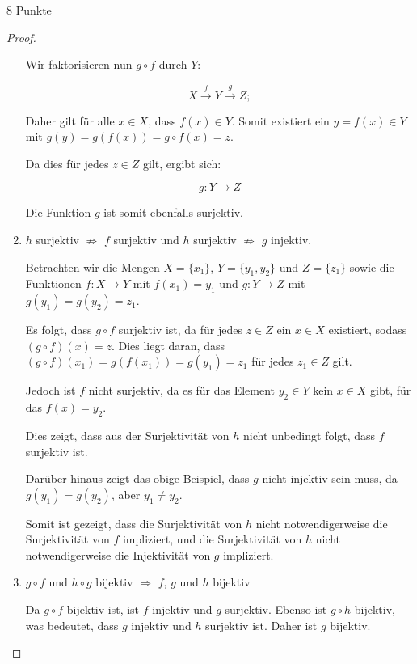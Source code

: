 \documentclass{problemset}
\begin{document}
\begin{problem}{8 Punkte}
\begin{proof}
\begin{enumerate}
              Wir faktorisieren nun \(g \circ f\) durch \(Y\):

              \[ X \overset{f}{\to} Y \overset{g}{\to} Z; \]

              Daher gilt für alle \(x \in X\), dass \(f(x) \in Y\). Somit
              existiert ein \(y = f(x) \in Y\) mit \(g(y) = g(f(x)) = g \circ
              f(x) = z\).

              Da dies für jedes \(z \in Z\) gilt, ergibt sich:

              \[ g: Y \to Z \]

              Die Funktion \(g\) ist somit ebenfalls surjektiv.

        \item $h$ surjektiv $\not\Rightarrow$ $f$ surjektiv und $h$ surjektiv $\not\Rightarrow$ $g$ injektiv.

              Betrachten wir die Mengen $X = \{x_1\}$, $Y = \{y_1, y_2\}$ und
              $Z = \{z_1\}$ sowie die Funktionen $f: X \to Y$ mit $f(x_1) =
              y_1$ und $g: Y \to Z$ mit $g(y_1) = g(y_2) = z_1$.

              Es folgt, dass $g \circ f$ surjektiv ist, da für jedes $z \in Z$
              ein $x \in X$ existiert, sodass $(g \circ f)(x) = z$. Dies liegt
              daran, dass $(g \circ f)(x_1) = g(f(x_1)) = g(y_1) = z_1$ für
              jedes $z_1 \in Z$ gilt.

              Jedoch ist $f$ nicht surjektiv, da es für das Element $y_2 \in Y$
              kein $x \in X$ gibt, für das $f(x) = y_2$.

              Dies zeigt, dass aus der Surjektivität von $h$ nicht unbedingt
              folgt, dass $f$ surjektiv ist.

              Darüber hinaus zeigt das obige Beispiel, dass $g$ nicht injektiv
              sein muss, da $g(y_1) = g(y_2)$, aber $y_1 \neq y_2$.

              Somit ist gezeigt, dass die Surjektivität von $h$ nicht
              notwendigerweise die Surjektivität von $f$ impliziert, und die
              Surjektivität von $h$ nicht notwendigerweise die Injektivität von
              $g$ impliziert. \checkmark

        \item $g \circ f$ und $h \circ g$ bijektiv $\Rightarrow$ $f$, $g$ und $h$ bijektiv

              Da $g \circ f$ bijektiv ist, ist $f$ injektiv und $g$ surjektiv.
              Ebenso ist $g \circ h$ bijektiv, was bedeutet, dass $g$ injektiv
              und $h$ surjektiv ist. Daher ist $g$ bijektiv.


\end{enumerate}
\end{proof}
\end{problem}
\end{document}
